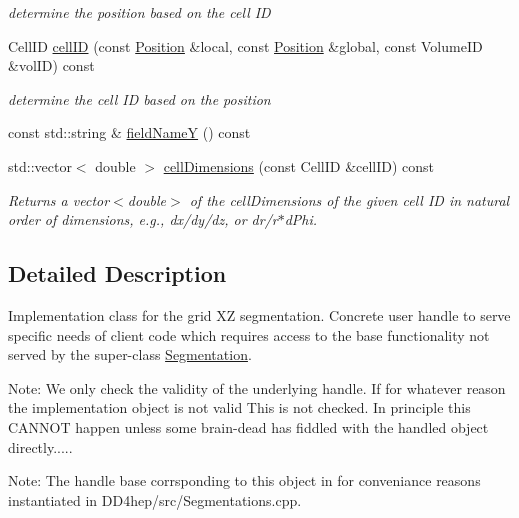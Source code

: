 \begin{DoxyCompactItemize}
\begin{DoxyCompactList}\small\item\em determine the position based on the cell ID \item\end{DoxyCompactList}\item 
CellID \hyperlink{class_d_d4hep_1_1_geometry_1_1_multi_segmentation_ab30df6aaf2cf4128c21679a9afd0087e}{cellID} (const \hyperlink{namespace_d_d4hep_1_1_geometry_a55083902099d03506c6db01b80404900}{Position} \&local, const \hyperlink{namespace_d_d4hep_1_1_geometry_a55083902099d03506c6db01b80404900}{Position} \&global, const VolumeID \&volID) const 
\begin{DoxyCompactList}\small\item\em determine the cell ID based on the position \item\end{DoxyCompactList}\item 
const std::string \& \hyperlink{class_d_d4hep_1_1_geometry_1_1_multi_segmentation_a87968a8c0890db6aee6251792a764bc8}{fieldNameY} () const 
\item 
std::vector$<$ double $>$ \hyperlink{class_d_d4hep_1_1_geometry_1_1_multi_segmentation_aab6ca6c547f06eff88d6d95260f6617c}{cellDimensions} (const CellID \&cellID) const 
\begin{DoxyCompactList}\small\item\em Returns a vector$<$double$>$ of the cellDimensions of the given cell ID in natural order of dimensions, e.g., dx/dy/dz, or dr/r$\ast$dPhi. \item\end{DoxyCompactList}\end{DoxyCompactItemize}


\subsection{Detailed Description}
Implementation class for the grid XZ segmentation. Concrete user handle to serve specific needs of client code which requires access to the base functionality not served by the super-\/class \hyperlink{class_d_d4hep_1_1_geometry_1_1_segmentation}{Segmentation}.

Note: We only check the validity of the underlying handle. If for whatever reason the implementation object is not valid This is not checked. In principle this CANNOT happen unless some brain-\/dead has fiddled with the handled object directly.....

Note: The handle base corrsponding to this object in for conveniance reasons instantiated in DD4hep/src/Segmentations.cpp.

